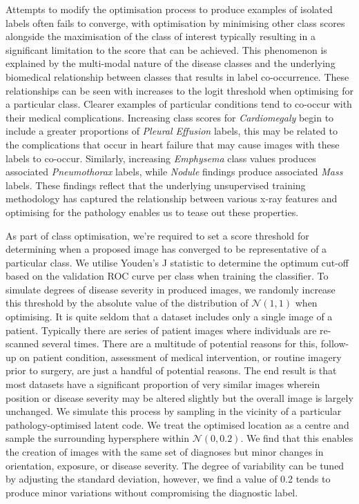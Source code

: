 \documentclass{article}
\begin{document}
Attempts to modify the optimisation process to produce examples of isolated labels often fails to converge, with optimisation by minimising other class scores alongside the maximisation of the class of interest typically resulting in a significant limitation to the score that can be achieved. This phenomenon is explained by the multi-modal nature of the disease classes and the underlying biomedical relationship between classes that results in label co-occurrence. These relationships can be seen with increases to the logit threshold when optimising for a particular class. Clearer examples of particular conditions tend to co-occur with their medical complications. Increasing class scores for \emph{Cardiomegaly} begin to include a greater proportions of \emph{Pleural Effusion} labels, this may be related to the complications that occur in heart failure that may cause images with these labels to co-occur. Similarly, increasing \emph{Emphysema} class values produces associated \emph{Pneumothorax} labels, while \emph{Nodule} findings produce associated \emph{Mass} labels. These findings reflect that the underlying unsupervised training methodology has captured the relationship between various x-ray features and optimising for the pathology enables us to tease out these properties.

As part of class optimisation, we're required to set a score threshold for determining when a proposed image has converged to be representative of a particular class. We utilise Youden's J statistic to determine the optimum cut-off based on the validation ROC curve per class when training the classifier. To simulate degrees of disease severity in produced images, we randomly increase this threshold by the absolute value of the distribution of $\mathcal{N}(1, 1)$ when optimising. It is quite seldom that a dataset includes only a single image of a patient. Typically there are series of patient images where individuals are re-scanned several times. There are a multitude of potential reasons for this, follow-up on patient condition, assessment of medical intervention, or routine imagery prior to surgery, are just a handful of potential reasons. The end result is that most datasets have a significant proportion of very similar images wherein position or disease severity may be altered slightly but the overall image is largely unchanged. We simulate this process by sampling in the vicinity of a particular pathology-optimised latent code. We treat the optimised location as a centre and sample the surrounding hypersphere within $\mathcal{N}(0, 0.2)$. We find that this enables the creation of images with the same set of diagnoses but minor changes in orientation, exposure, or disease severity. The degree of variability can be tuned by adjusting the standard deviation, however, we find a value of \num{0.2} tends to produce minor variations without compromising the diagnostic label.
\end{document}
